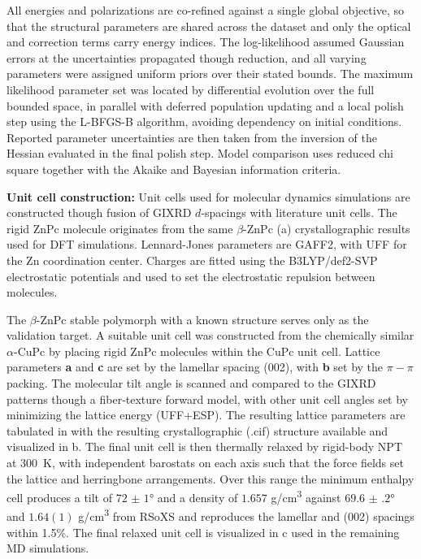 All energies and polarizations are co-refined against a single global objective, so that the structural parameters are shared across the dataset and only the optical and correction terms carry energy indices. The log-likelihood assumed Gaussian errors at the uncertainties propagated though reduction, and all varying parameters were assigned uniform priors over their stated bounds. The maximum likelihood parameter set was located by differential evolution over the full bounded space, in parallel with deferred population updating and a local polish step using the L-BFGS-B algorithm, avoiding dependency on initial conditions. Reported parameter uncertainties are then taken from the inversion of the Hessian evaluated in the final polish step. Model comparison uses reduced chi square together with the Akaike and Bayesian information criteria.

\textbf{Unit cell construction:} Unit cells used for molecular dynamics simulations are constructed though fusion of GIXRD \(d\)-spacings with literature unit cells. The rigid ZnPc molecule originates from the same \(\beta\)-ZnPc (a) crystallographic results used for DFT simulations.\autocite{maiDataDensityFunction2020} Lennard-Jones parameters are GAFF2, with UFF for the Zn coordination center. Charges are fitted using the B3LYP/def2-SVP electrostatic potentials and used to set the electrostatic repulsion between molecules.

The \(\beta\)-ZnPc stable polymorph with a known structure serves only as the validation target. A suitable unit cell was constructed from the chemically similar \(\alpha\)-CuPc by placing rigid ZnPc molecules within the CuPc unit cell. Lattice parameters \textbf{a} and \textbf{c} are set by the lamellar spacing (002), with \textbf{b} set by the \(\pi - \pi\) packing. The molecular tilt angle is scanned and compared to the GIXRD patterns though a fiber-texture forward model, with other unit cell angles set by minimizing the lattice energy (UFF+ESP). The resulting lattice parameters are tabulated in  with the resulting crystallographic (.cif) structure available and visualized in b. The final unit cell is then thermally relaxed by rigid-body NPT at \qty{300}{K}, with independent barostats on each axis such that the force fields set the lattice and herringbone arrangements. Over this range the minimum enthalpy cell produces a tilt of \(\ang{72(1)}\) and a density of \(1.657\) g/cm\textsuperscript{3} against \(\ang{69.6(2)}\) and \(1.64(1)\) g/cm\textsuperscript{3} from RSoXS and reproduces the lamellar and (002) spacings within 1.5\%. The final relaxed unit cell is visualized in c used in the remaining MD simulations.

